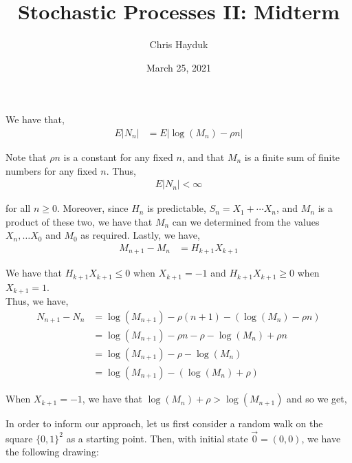 \documentclass[12pt]{article}
\newenvironment{problem}[2][Problem]{\begin{trivlist}
\item[\hskip \labelsep {\bfseries #1}\hskip \labelsep {\bfseries #2.}]}{\end{trivlist}}
\begin{document}
\title{Stochastic Processes II: Midterm}

\author{Chris Hayduk}
\date{March 25, 2021}

\maketitle

\begin{problem}{I}
\end{problem}

We have that,
\begin{align*}
E|N_n| &= E|\log(M_n) - \rho n|
\end{align*}

Note that $\rho n$ is a constant for any fixed $n$, and that $M_n$ is a finite sum of finite numbers for any fixed $n$. Thus,
\begin{align*}
E|N_n| < \infty
\end{align*}

for all $n \geq 0$. Moreover, since $H_n$ is predictable, $S_n = X_1 + \cdots X_n$, and $M_n$ is a product of these two, we have that $M_n$ can we determined from the values $X_n, \ldots X_0$ and $M_0$ as required. Lastly, we have,
\begin{align*}
M_{n+1} - M_n &= H_{k+1}X_{k+1}
\end{align*}

We have that $H_{k+1}X_{k+1} \leq 0$ when $X_{k+1} = -1$ and $H_{k+1}X_{k+1} \geq 0$ when $X_{k+1} = 1$.\\

Thus, we have,
\begin{align*}
N_{n+1} - N_{n} &= \log(M_{n+1}) - \rho (n+1) - (\log(M_{n}) - \rho n)\\
&= \log(M_{n+1}) - \rho n - \rho - \log(M_{n}) + \rho n\\
&= \log(M_{n+1}) - \rho - \log(M_{n})\\
&= \log(M_{n+1}) - (\log(M_{n}) + \rho)
\end{align*}

When $X_{k+1} = -1$, we have that $\log(M_n) + \rho > \log(M_{n+1})$ and so we get,



\begin{problem}{II}
\end{problem}

In order to inform our approach, let us first consider a random walk on the square $\{0, 1\}^2$ as a starting point. Then, with initial state $\vec{0} = (0, 0)$, we have the following drawing:
\end{document}
